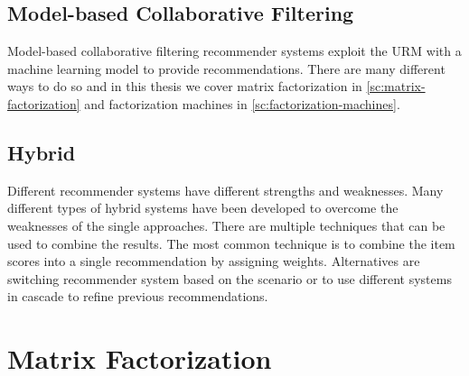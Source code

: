 \subsection{Model-based Collaborative Filtering}

Model-based collaborative filtering recommender systems exploit the URM with a machine learning model to provide recommendations. There are many different ways to do so and in this thesis we cover matrix factorization in \autoref{sc:matrix-factorization} and factorization machines in \autoref{sc:factorization-machines}.


\subsection{Hybrid}

Different recommender systems have different strengths and weaknesses. Many different types of hybrid systems have been developed to overcome the weaknesses of the single approaches. There are multiple techniques that can be used to combine the results. The most common technique is to combine the item scores into a single recommendation by assigning weights. Alternatives are switching recommender system based on the scenario or to use different systems in cascade to refine previous recommendations.



\section{Matrix Factorization}
\label{sc:matrix-factorization}

